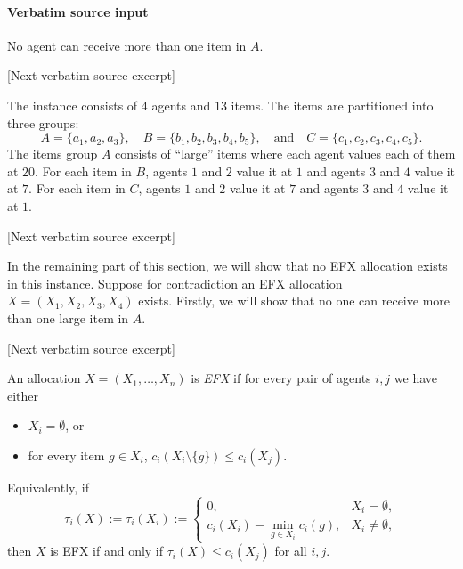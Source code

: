 \documentclass[10pt]{article}
\begin{document}
\paragraph{Verbatim source input}
\begin{ReviewVerbatim}
\begin{proposition}
    No agent can receive more than one item in $A$.
\end{proposition}

[Next verbatim source excerpt]

The instance consists of $4$ agents and $13$ items.
The items are partitioned into three groups:
$$A=\{a_1,a_2,a_3\},\quad B=\{b_1,b_2,b_3,b_4,b_5\},\quad\mbox{and}\quad C=\{c_1,c_2,c_3,c_4,c_5\}.$$
The items group $A$ consists of ``large'' items where each agent values each of them at $20$.
For each item in $B$, agents $1$ and $2$ value it at $1$ and agents $3$ and $4$ value it at $7$.
For each item in $C$, agents $1$ and $2$ value it at $7$ and agents $3$ and $4$ value it at $1$.

[Next verbatim source excerpt]

In the remaining part of this section, we will show that no EFX allocation exists in this instance.
Suppose for contradiction an EFX allocation $X=(X_1,X_2,X_3,X_4)$ exists.
Firstly, we will show that no one can receive more than one large item in $A$.

[Next verbatim source excerpt]

\begin{definition}
An allocation $X=(X_1,\ldots,X_n)$ is \emph{EFX} if for every pair of agents $i,j$ we have either
\begin{itemize}
    \item $X_i=\emptyset$, or
    \item for every item $g\in X_i$, $c_i(X_i\setminus\{g\})\le c_i(X_j).$
\end{itemize}
Equivalently, if
\[
    \tau_i(X):=\tau_i(X_i):=
    \begin{cases}
        0, & X_i=\emptyset,\\
        c_i(X_i)-\min_{g\in X_i}c_i(g), & X_i\ne\emptyset,
    \end{cases}
\]
then $X$ is EFX if and only if $\tau_i(X)\le c_i(X_j)$ for all $i,j$.
\end{definition}
\end{ReviewVerbatim}
\end{document}
